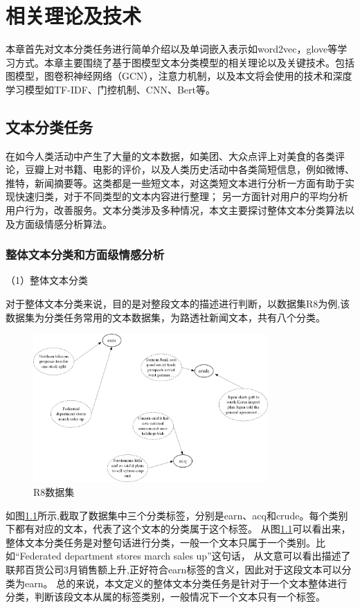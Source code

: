 \chapter{相关理论及技术}
本章首先对文本分类任务进行简单介绍以及单词嵌入表示如word2vec，glove等学习方式。本章主要围绕了基于图模型文本分类模型的相关理论以及关键技术。包括图模型，图卷积神经网络（GCN），注意力机制，以及本文将会使用的技术和深度学习模型如TF-IDF、门控机制、CNN、Bert等。
\section{文本分类任务}
在如今人类活动中产生了大量的文本数据，如美团、大众点评上对美食的各类评论，豆瓣上对书籍、电影的评价，以及人类历史活动中各类简短信息，例如微博、推特，新闻摘要等。这类都是一些短文本，对这类短文本进行分析一方面有助于实现快速归类，对于不同类型的文本内容进行整理；
另一方面针对用户的平均分析用户行为，改善服务。文本分类涉及多种情况，本文主要探讨整体文本分类算法以及方面级情感分析算法。
\subsection{整体文本分类和方面级情感分析}
（1）整体文本分类

对于整体文本分类来说，目的是对整段文本的描述进行判断，以数据集R8为例,该数据集为分类任务常用的文本数据集，为路透社新闻文本，共有八个分类。

\begin{figure}[htb]%
	\setlength{\belowcaptionskip}{0pt}
	\centering
	\includegraphics[width=0.8\textwidth]{pic/2-1.png}
	\caption{R8数据集}
	\label{R8datasets}
\end{figure}
如图\ref{R8datasets}所示,截取了数据集中三个分类标签，分别是earn、acq和crude。每个类别下都有对应的文本，代表了这个文本的分类属于这个标签。
从图\ref{R8datasets}可以看出来，整体文本分类任务是对整句话进行分类，一般一个文本只属于一个类别。比如“Federated department stores march sales up”这句话，
从文意可以看出描述了联邦百货公司3月销售额上升,正好符合earn标签的含义，因此对于这段文本可以分类为earn。
总的来说，本文定义的整体文本分类任务是针对于一个文本整体进行分类，判断该段文本从属的标签类别，一般情况下一个文本只有一个标签。


